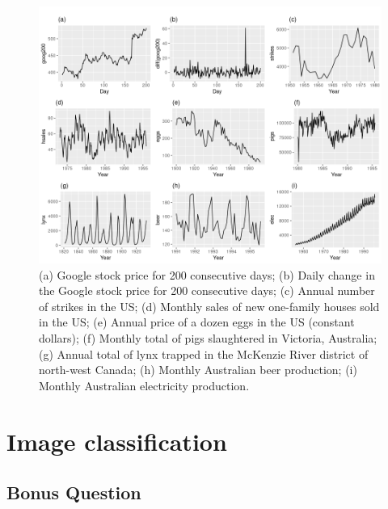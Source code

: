 \documentclass[]{article}
\begin{document}
\begin{figure}
	\centering
	\includegraphics[width=1\textwidth]{images/time_series.png}
		\caption{(a) Google stock price for 200 consecutive days; (b) Daily change in the Google stock price for 200 consecutive days; (c) Annual number of strikes in the US; (d) Monthly sales of new one-family houses sold in the US; (e) Annual price of a dozen eggs in the US (constant dollars); (f) Monthly total of pigs slaughtered in Victoria, Australia; (g) Annual total of lynx trapped in the McKenzie River district of north-west Canada; (h) Monthly Australian beer production; (i) Monthly Australian electricity production.}
		\label{fig:time_series}
\end{figure}

\subsection{}
\subsection{}
\section{Image classification}
\subsection{}
\subsection{}
\subsection{}
\subsection{}
\subsection{Bonus Question}
\end{document}
